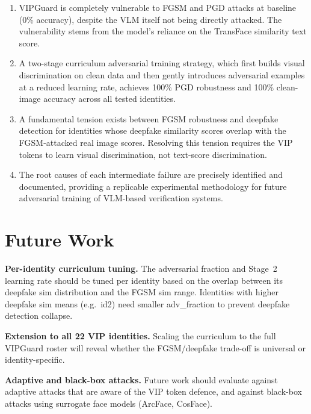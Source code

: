 \documentclass[12pt,a4paper]{article}
\begin{document}
\begin{enumerate}[leftmargin=*]
  \item VIPGuard is completely vulnerable to FGSM and PGD attacks at baseline
  (0\% accuracy), despite the VLM itself not being directly attacked.  The
  vulnerability stems from the model's reliance on the TransFace similarity
  text score.

  \item A two-stage curriculum adversarial training strategy, which first builds
  visual discrimination on clean data and then gently introduces adversarial
  examples at a reduced learning rate, achieves 100\% PGD robustness and 100\%
  clean-image accuracy across all tested identities.

  \item A fundamental tension exists between FGSM robustness and deepfake
  detection for identities whose deepfake similarity scores overlap with the
  FGSM-attacked real image scores.  Resolving this tension requires the VIP
  tokens to learn visual discrimination, not text-score discrimination.

  \item The root causes of each intermediate failure are precisely identified
  and documented, providing a replicable experimental methodology for future
  adversarial training of VLM-based verification systems.
\end{enumerate}

\section{Future Work}

\textbf{Per-identity curriculum tuning.}  The adversarial fraction and Stage~2
learning rate should be tuned per identity based on the overlap between its
deepfake sim distribution and the FGSM sim range.  Identities with higher
deepfake sim means (e.g.\ id2) need smaller adv\_fraction to prevent deepfake
detection collapse.

\textbf{Extension to all 22 VIP identities.}  Scaling the curriculum to the
full VIPGuard roster will reveal whether the FGSM/deepfake trade-off is
universal or identity-specific.

\textbf{Adaptive and black-box attacks.}  Future work should evaluate against
adaptive attacks that are aware of the VIP token defence, and against black-box
attacks using surrogate face models (ArcFace, CosFace).
\end{document}
